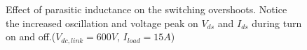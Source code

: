 \documentclass[12pt]{article} %
\begin{document}
\begin{figure}[h]
     \centering
        \caption{Effect of parasitic inductance on the switching overshoots. Notice the increased oscillation and voltage peak on $V_{ds}$ and $I_{ds}$ during turn on and off.($V_{dc,link}=600V$, $I_{load}=15A$)}
	\label{fig:parasiticswitching}
\end{figure}
\end{document}
